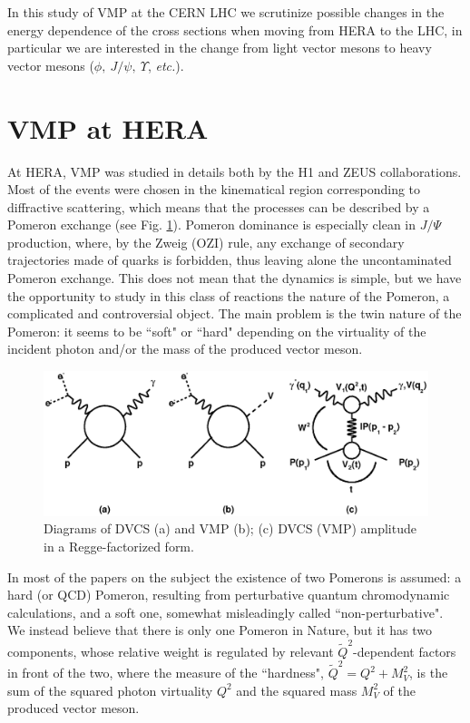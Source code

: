 \documentclass[12pt]{article}
\begin{document}
In this study of VMP at the CERN LHC we scrutinize possible changes in the energy dependence of the cross sections when moving from HERA to the LHC, in particular we are interested in the change from light vector mesons to heavy vector mesons ($\phi,\  J/\psi,\  \Upsilon$,  {\it etc.}).

\section{VMP at HERA}
At HERA, VMP was studied in details both by the H1 and ZEUS collaborations. Most of the events were chosen in the 
kinematical region corresponding to diffractive scattering, which means that the processes can be described by a Pomeron exchange (see Fig. \ref{fig:diagrams}). Pomeron dominance is especially clean in $J/\Psi$ production, where,
by the Zweig (OZI) rule, any exchange of secondary trajectories made of quarks is forbidden, thus leaving alone the uncontaminated Pomeron exchange.  This does not mean that the dynamics is simple, but we have the opportunity 
to study in this class of reactions the nature of the Pomeron, a complicated and controversial object. 
The main problem is the twin nature of the Pomeron: it seems to be ``soft" or ``hard" depending on the virtuality of the incident photon and/or the mass of the produced vector meson.   
     
\begin{figure}[!h]
\centering
\includegraphics[width=.8\textwidth]{figures/diagrams.eps}
\caption{Diagrams of DVCS (a) and VMP (b); (c) DVCS (VMP) amplitude in a Regge-factorized form.}
\label{fig:diagrams}
\end{figure}

In most of the papers on the subject the existence of two Pomerons is assumed: a hard (or QCD) Pomeron, resulting from 
perturbative quantum chromodynamic calculations, and a soft one, somewhat misleadingly called ``non-perturbative". 
We instead believe that there is only one Pomeron in Nature, but it has two components, whose relative weight is 
regulated by relevant $\widetilde Q^2$-dependent factors in front of the two, where the measure of the ``hardness", $\widetilde Q^2=Q^2+M_V^2$, is the sum of the squared photon virtuality $Q^2$ and the squared mass $M^2_V$ of the produced vector meson.  
\end{document}
